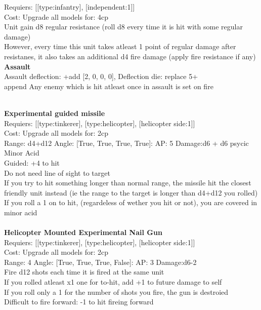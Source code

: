 Requiers: [[type:infantry], [independent:1]] \\
Cost: Upgrade all models for: 4cp \\
Unit gain d8 regular resistance (roll d8 every time it is hit with some regular damage)\\ 
However, every time this unit takes atleast 1 point of regular damage after resistanes, it also takes an additional d4 fire damage (apply fire resistance if any)\\ 




{\bf Assault} \ \\
Assault deflection: +add [2, 0, 0, 0], Deflection die: replace 5+
\\ 

append Any enemy which is hit atleast once in assault is set on fire


\ \\
{\bf Experimental guided missile } \\

Requiers: [[type:tinkerer], [type:helicopter], [helicopter side:1]] \\
Cost: Upgrade all models for: 2cp \\


Range: d4+d12  Angle: [True, True, True, True]: AP: 5 Damage:d6 + d6 psycic \\
Minor Acid\\ 
Guided: +4 to hit\\ 
Do not need line of sight to target\\ 
If you try to hit something longer than normal range, the missile hit the closest friendly unit instead (ie the range to the target is longer than d4+d12 you rolled)\\ 
If you roll a 1 on to hit, (regardeless of wether you hit or not), you are covered in minor acid\\ 








\ \\
{\bf Helicopter Mounted Experimental Nail Gun } \\

Requiers: [[type:tinkerer], [type:helicopter], [helicopter side:1]] \\
Cost: Upgrade all models for: 2cp \\


Range: 4  Angle: [True, True, True, False]: AP: 3 Damage:d6-2 \\
Fire d12 shots each time it is fired at the same unit\\ 
If you rolled atleast x1 one for to-hit, add +1 to future damage to self\\ 
If you roll only a 1 for the number of shots you fire, the gun is destroied\\ 
Difficult to fire forward: -1 to hit fireing forward\\ 








